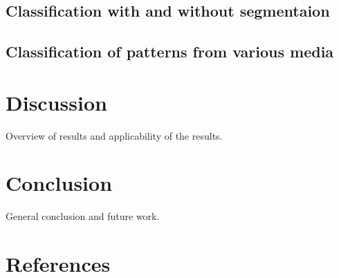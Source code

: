 \documentclass[review]{elsarticle}
\begin{document}
\subsection{Classification with and without segmentaion}

\subsection{Classification of patterns from various media}

\section{Discussion}
Overview of results and applicability of the results.

\section{Conclusion}
General conclusion and future work.

\section*{References}


\end{document}
